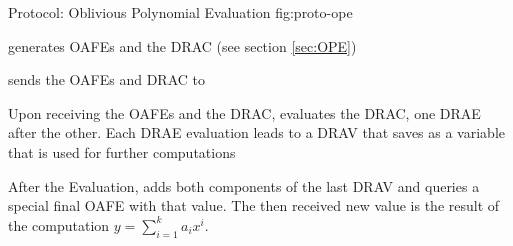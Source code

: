 \begin{JWprotocol}%
  {\JWprotoSymOPE}%
  {Protocol: Oblivious Polynomial Evaluation}%
  {fig:proto-ope}


  \begin{JWprotoSteps}

  \item \JWpOne{} generates OAFEs and the DRAC (see section \ref{sec:OPE})

  \item \JWpOne{} sends the OAFEs and DRAC to \JWpTwo{}

  \end{JWprotoSteps}



  \begin{JWprotoSteps}

  \item Upon receiving the OAFEs and the DRAC, \JWpTwo{} evaluates the DRAC,
    one DRAE after the other. Each DRAE evaluation leads to a DRAV that
    \JWpTwo{} saves as a variable that is used for further computations

  \item After the Evaluation, \JWpTwo{} adds both components of the last DRAV
    and queries a special final OAFE with that value. The then received new
    value is the result of the computation $y = \sum_{i=1}^k a_ix^i$.

  \end{JWprotoSteps}

\end{JWprotocol}
